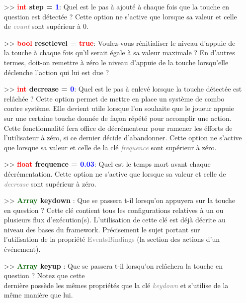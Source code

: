 \documentclass[a4paper, 11pt]{article}
\begin{document}
\begin{itemize}
		\item[>> \textbf{\textcolor{red}{int} step = \textcolor{blue}{1}}:] Quel est le pas à ajouté à 
		chaque fois que la touche en question est détectée ? Cette option ne s'active que lorsque sa valeur 
		et celle de \textit{\textcolor{gray}{count}} sont supérieur à 0.\\
		\item[>> \textbf{\textcolor{red}{bool} resetlevel = \textcolor{red}{true}}:] Voulez-vous 
		rénitialiser le niveau d'appuie de la touche à chaque fois qu'il serait égale à sa valeur maximale ?
		En d'autres termes, doit-on remettre à zéro le niveau d'appuie de la touche lorsqu'elle déclenche
		l'action qui lui est due ?\\
		\item[>> \textbf{\textcolor{red}{int} decrease = \textcolor{blue}{0}}:] Quel est le pas à enlevé 
		lorsque la touche détectée est relâchée ? Cette option permet de mettre en place un système de combo 
		contre système. Elle devient utile lorsque l'on souhaite que le joueur appuie sur une certaine 
		touche donnée de façon répété pour accomplir une action. Cette fonctionnalité fera office de 
		décrémenteur pour ramener les éfforts de l'utilisateur à zéro, si ce dernier décide d'abandonner. 
		Cette option ne s'active que lorsque sa valeur et celle de la clé \textcolor{gray}
		{\textit{frequence}} sont supérieur à zéro.\\
		\item[>> \textbf{\textcolor{red}{float} frequence = \textcolor{blue}{0.03}}:] Quel est le temps mort 
		avant chaque décrémentation. Cette option ne s'active que lorsque sa valeur et celle de
		\textcolor{gray}{\textit{decrease}} sont supérieur à zéro.\\
		\item[>> \textbf{\textcolor{darkgreen}{Array} keydown}]: Que se passera t-il lorsqu'on appuyera sur 
		la touche en question ? Cette clé contient tous les configurations relatives à un ou plusieurs flux 
		d'exécution(s). L'utilisation de cette clé est déjà décrite au niveau des bases du framework. 
		Précisement le sujet portant sur \\l'utilisation de la propriété \textcolor{gray}{EventsBindings} 
		(la section des actions d'un événement).\\
		\item[>> \textbf{\textcolor{darkgreen}{Array} keyup}]: Que se passera t-il lorsqu'on relâchera la
		touche en question ? Notez que cette \\dernière possède les mêmes propriétés que la clé 
		\textit{\textcolor{gray}{keydown}} et s'utilise de la même manière que lui.\\
	\end{itemize}
\end{document}
